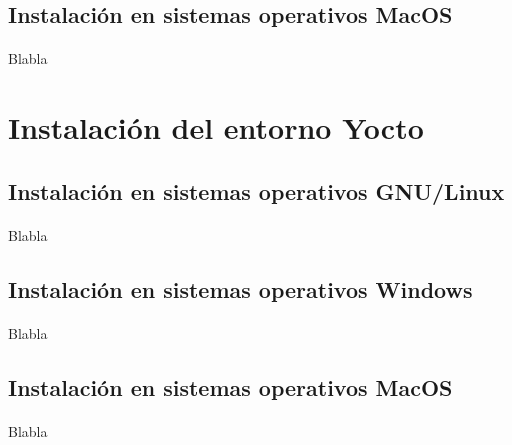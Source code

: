 \subsection{Instalación en sistemas operativos MacOS}

\paragraph{}Blabla

\section{Instalación del entorno Yocto}

\subsection{Instalación en sistemas operativos GNU/Linux}

\paragraph{}Blabla

\subsection{Instalación en sistemas operativos Windows}

\paragraph{}Blabla

\subsection{Instalación en sistemas operativos MacOS}

\paragraph{}Blabla

